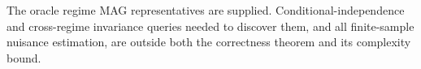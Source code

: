 The oracle regime MAG representatives are supplied.  Conditional-independence and cross-regime invariance queries needed to discover them, and all finite-sample nuisance estimation, are outside both the correctness theorem and its complexity bound.